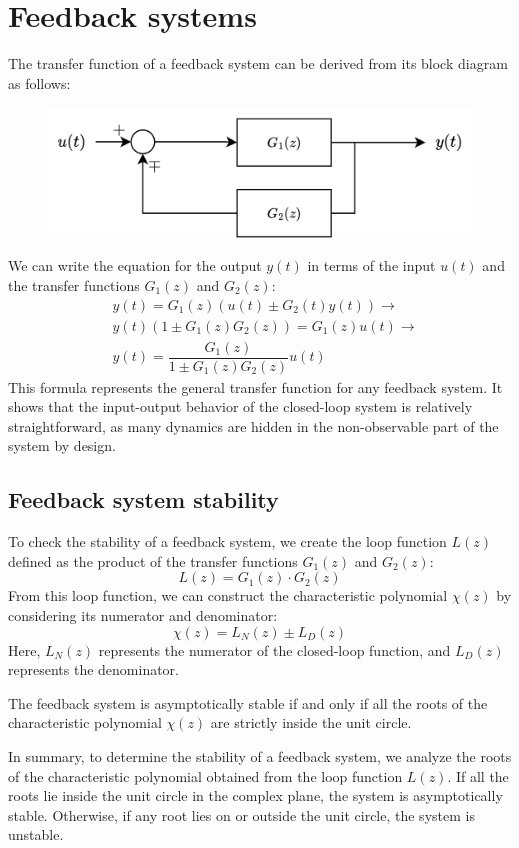 \section{Feedback systems}

The transfer function of a feedback system can be derived from its block diagram as follows:
\begin{figure}[H]
    \centering
    \includegraphics[width=0.6\linewidth]{images/feedback.png}
\end{figure}
We can write the equation for the output $y(t)$ in terms of the input $u(t)$ and the transfer functions $G_1(z)$ and $G_2(z)$:
\begin{align*}
    &y(t)=G_1(z)\left(u(t)\pm G_2(t)y(t)\right) \rightarrow \\
    &y(t)\left(1 \pm G_1(z)G_2(z)\right)=G_1(z)u(t) \rightarrow \\
    &y(t)=\dfrac{G_1(z)}{1 \pm G_1(z)G_2(z)}u(t)
\end{align*}
This formula represents the general transfer function for any feedback system. 
It shows that the input-output behavior of the closed-loop system is relatively straightforward, as many dynamics are hidden in the non-observable part of the system by design. 

\subsection{Feedback system stability}
To check the stability of a feedback system, we create the loop function $L(z)$ defined as the product of the transfer functions $G_1(z)$ and $G_2(z)$:
\[L(z)=G_1(z)\cdot G_2(z)\]
From this loop function, we can construct the characteristic polynomial $\chi(z)$ by considering its numerator and denominator:
\[\chi(z)=L_{N}(z)\pm L_D(z)\]
Here, $L_{N}(z)$ represents the numerator of the closed-loop function, and $L_{D}(z)$ represents the denominator.
\begin{theorem}
    The feedback system is asymptotically stable if and only if all the roots of the characteristic polynomial $\chi(z)$ are strictly inside the unit circle.
\end{theorem}
In summary, to determine the stability of a feedback system, we analyze the roots of the characteristic polynomial obtained from the loop function $L(z)$. 
If all the roots lie inside the unit circle in the complex plane, the system is asymptotically stable. 
Otherwise, if any root lies on or outside the unit circle, the system is unstable.